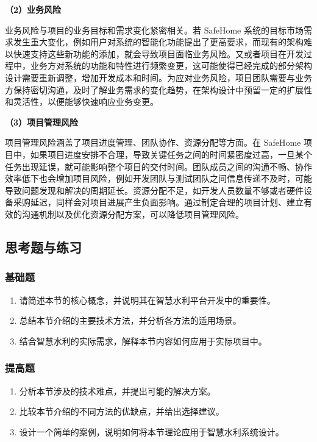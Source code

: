 \textbf{（2）业务风险}

业务风险与项目的业务目标和需求变化紧密相关。若 SafeHome 系统的目标市场需求发生重大变化，例如用户对系统的智能化功能提出了更高要求，而现有的架构难以快速支持这些新功能的添加，就会导致项目面临业务风险。又或者项目在开发过程中，业务方对系统的功能和特性进行频繁变更，这可能使得已经完成的部分架构设计需要重新调整，增加开发成本和时间。为应对业务风险，项目团队需要与业务方保持密切沟通，及时了解业务需求的变化趋势，在架构设计中预留一定的扩展性和灵活性，以便能够快速响应业务变更。

\textbf{（3）项目管理风险}

项目管理风险涵盖了项目进度管理、团队协作、资源分配等方面。在 SafeHome 项目中，如果项目进度安排不合理，导致关键任务之间的时间紧密度过高，一旦某个任务出现延误，就可能影响整个项目的交付时间。团队成员之间的沟通不畅、协作效率低下也会增加项目风险，例如开发团队与测试团队之间信息传递不及时，可能导致问题发现和解决的周期延长。资源分配不足，如开发人员数量不够或者硬件设备采购延迟，同样会对项目进展产生负面影响。通过制定合理的项目计划、建立有效的沟通机制以及优化资源分配方案，可以降低项目管理风险。

\subsection{思考题与练习}\label{ux601dux8003ux9898ux4e0eux7ec3ux4e60-1}

\subsubsection{基础题}\label{ux57faux7840ux9898-1}

\begin{enumerate}
\def\labelenumi{\arabic{enumi}.}
\tightlist
\item
  请简述本节的核心概念，并说明其在智慧水利平台开发中的重要性。
\item
  总结本节介绍的主要技术方法，并分析各方法的适用场景。
\item
  结合智慧水利的实际需求，解释本节内容如何应用于实际项目中。
\end{enumerate}

\subsubsection{提高题}\label{ux63d0ux9ad8ux9898-1}

\begin{enumerate}
\def\labelenumi{\arabic{enumi}.}
\setcounter{enumi}{3}
\tightlist
\item
  分析本节涉及的技术难点，并提出可能的解决方案。
\item
  比较本节介绍的不同方法的优缺点，并给出选择建议。
\item
  设计一个简单的案例，说明如何将本节理论应用于智慧水利系统设计。
\end{enumerate}

